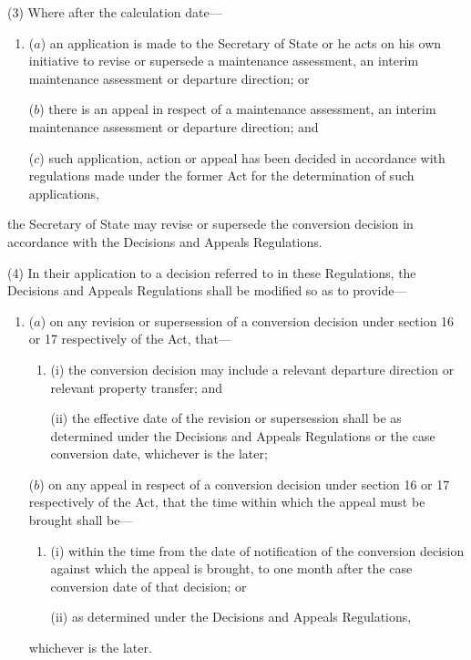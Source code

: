 \documentclass[12pt,a4paper]{article}
\begin{document}
(3) Where after the calculation date—
\begin{enumerate}\item[]
($a$) an application is made to the Secretary of State or he acts on his own initiative to revise or supersede a maintenance assessment, an interim maintenance assessment or departure direction; or

($b$) there is an appeal in respect of a maintenance assessment, an interim maintenance assessment or departure direction; and

($c$) such application, action or appeal has been decided in accordance with regulations made under the former Act for the determination of such applications,
\end{enumerate}
the Secretary of State may revise or supersede the conversion decision in accordance with the Decisions and Appeals Regulations.

%

(4) In their application to a decision referred to in these Regulations, the Decisions and Appeals Regulations shall be modified so as to provide—
\begin{enumerate}\item[]
($a$) on any revision or supersession of a conversion decision under section 16 or 17 respectively of the Act, that—
\begin{enumerate}\item[]
(i) the conversion decision may include a relevant departure direction or relevant property transfer; and

(ii) the effective date of the revision or supersession shall be as determined under the Decisions and Appeals Regulations or the case conversion date, whichever is the later;
\end{enumerate}

($b$) on any appeal in respect of a conversion decision under section 16 or 17 respectively of the Act, that the time within which the appeal must be brought shall be—
\begin{enumerate}\item[]
(i) within the time from the date of notification of the conversion decision against which the appeal is brought, to one month after the case conversion date of that decision; or

(ii) as determined under the Decisions and Appeals Regulations,
\end{enumerate}
whichever is the later.
\end{enumerate}
\end{document}

